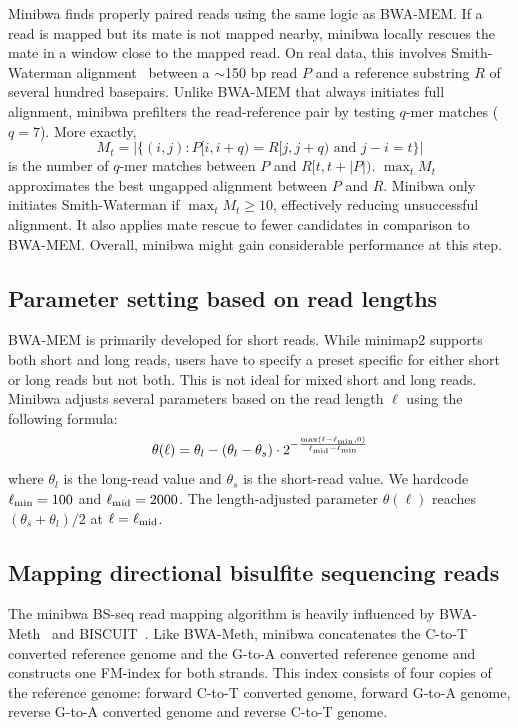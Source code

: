 \documentclass[webpdf,contemporary,large,namedate]{oup-authoring-template}%
\begin{document}
Minibwa finds properly paired reads using the same logic as BWA-MEM.
If a read is mapped but its mate is not mapped nearby,
minibwa locally rescues the mate in a window close to the mapped read.
On real data, this involves Smith-Waterman alignment~\citep{Smith:1981aa,Farrar:2007hs} between a $\sim$150 bp read $P$ and a reference substring $R$ of several hundred basepairs.
Unlike BWA-MEM that always initiates full alignment,
minibwa prefilters the read-reference pair by testing $q$-mer matches ($q=7$).
More exactly,
$$
M_t=|\{(i,j):\mbox{$P[i,i+q)=R[j,j+q)$ and $j-i=t$}\}|
$$
is the number of $q$-mer matches between $P$ and $R[t,t+|P|)$.
$\max_t M_t$ approximates the best ungapped alignment between $P$ and $R$.
Minibwa only initiates Smith-Waterman if $\max_t M_t\ge10$,
effectively reducing unsuccessful alignment.
It also applies mate rescue to fewer candidates in comparison to BWA-MEM.
Overall, minibwa might gain considerable performance at this step.

\subsection{Parameter setting based on read lengths}

BWA-MEM is primarily developed for short reads.
While minimap2 supports both short and long reads,
users have to specify a preset specific for either short or long reads but not both.
This is not ideal for mixed short and long reads.
Minibwa adjusts several parameters based on the read length $\ell$ using the following formula:
$$
\theta(\ell)=\theta_l-(\theta_l-\theta_s)\cdot 2^{-\frac{\max(\ell-\ell_{\rm min},0)}{\ell_{\rm mid}-\ell_{\rm min}}}
$$
where $\theta_l$ is the long-read value and $\theta_s$ is the short-read value.
We hardcode $\ell_{\rm min}=100$ and $\ell_{\rm mid}=2000$.
The length-adjusted parameter $\theta(\ell)$ reaches $(\theta_s+\theta_l)/2$ at $\ell=\ell_{\rm mid}$.

\subsection{Mapping directional bisulfite sequencing reads}\label{sec:meth}

The minibwa BS-seq read mapping algorithm is heavily influenced by BWA-Meth~\citep{Pedersen:2014aa} and BISCUIT~\citep{Zhou:2024ac}.
Like BWA-Meth, minibwa concatenates the C-to-T converted reference genome
and the G-to-A converted reference genome and constructs one FM-index for both strands.
This index consists of four copies of the reference genome:
forward C-to-T converted genome, forward G-to-A genome,
reverse G-to-A converted genome and reverse C-to-T genome.
\end{document}
